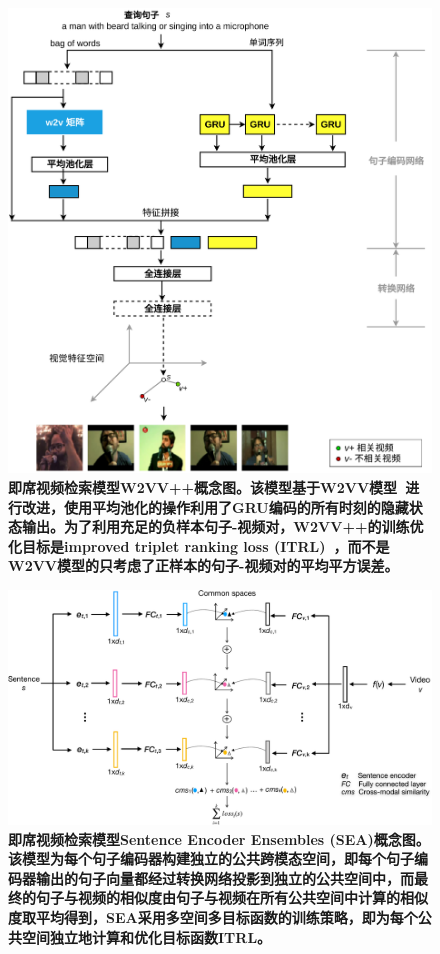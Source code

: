 \begin{figure}[tbh!]
    \centering
    \includegraphics[width=\linewidth]{figures/w2vv++}
    \caption[即席视频检索模型W2VV++概念图]{\textbf{即席视频检索模型W2VV++概念图。该模型基于W2VV模型~\cite{dong2018predicting}进行改进，使用平均池化的操作利用了GRU编码的所有时刻的隐藏状态输出。为了利用充足的负样本句子-视频对，W2VV++的训练优化目标是improved triplet ranking loss (ITRL)~\cite{faghri2017vse++}，而不是W2VV模型的只考虑了正样本的句子-视频对的平均平方误差。}}
    \label{fig:w2vv++}
\end{figure}

\begin{figure}[tbh!]
    \centering
    \includegraphics[width=\linewidth]{figures/sea}
    \caption[即席视频检索模型SEA概念图]{\textbf{即席视频检索模型Sentence Encoder Ensembles (SEA)概念图。该模型为每个句子编码器构建独立的公共跨模态空间，即每个句子编码器输出的句子向量都经过转换网络投影到独立的公共空间中，而最终的句子与视频的相似度由句子与视频在所有公共空间中计算的相似度取平均得到，SEA采用多空间多目标函数的训练策略，即为每个公共空间独立地计算和优化目标函数ITRL。}}
    \label{fig:sea}
\end{figure}

